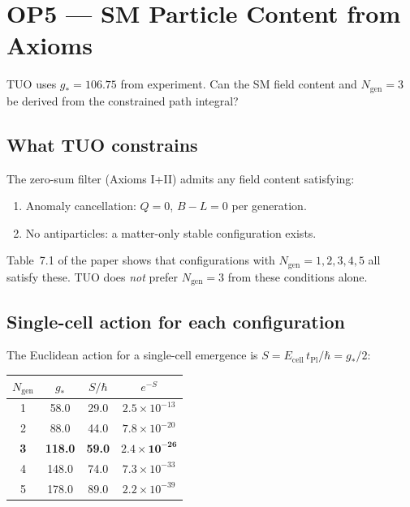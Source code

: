 \documentclass[12pt,a4paper]{article}
\theoremstyle{remark}
\newcommand{\tPl}{t_{\mathrm{Pl}}}
\newcommand{\gstar}{g_{*}}
\newcommand{\ecell}{E_{\mathrm{cell}}}
\begin{document}
\section{OP5 --- SM Particle Content from Axioms}
\label{sec:op5}

\begin{tcolorbox}[opbox,title={Open Problem 5}]
TUO uses $\gstar = 106.75$ from experiment.
Can the SM field content and $N_\mathrm{gen} = 3$ be derived from the
constrained path integral?
\end{tcolorbox}

\subsection{What TUO constrains}

The zero-sum filter (Axioms I+II) admits any field content satisfying:
\begin{enumerate}[label=(\roman*)]
  \item Anomaly cancellation: $Q = 0$, $B - L = 0$ per generation.
  \item No antiparticles: a matter-only stable configuration exists.
\end{enumerate}
Table~7.1 of the paper shows that configurations with
$N_\mathrm{gen} = 1,2,3,4,5$ all satisfy these.
TUO does \emph{not} prefer $N_\mathrm{gen} = 3$ from these conditions alone.

\subsection{Single-cell action for each configuration}

The Euclidean action for a single-cell emergence is
$S = \ecell\,\tPl/\hbar = \gstar/2$:

\begin{center}
\begin{tabular}{cccc}
\toprule
$N_\mathrm{gen}$ & $\gstar$ & $S/\hbar$ & $e^{-S}$ \\
\midrule
1 & 58.0  & 29.0 & $2.5\times10^{-13}$ \\
2 & 88.0  & 44.0 & $7.8\times10^{-20}$ \\
\textbf{3} & \textbf{118.0} & \textbf{59.0} & $\mathbf{2.4\times10^{-26}}$ \\
4 & 148.0 & 74.0 & $7.3\times10^{-33}$ \\
5 & 178.0 & 89.0 & $2.2\times10^{-39}$ \\
\bottomrule
\end{tabular}
\end{center}
\end{document}
